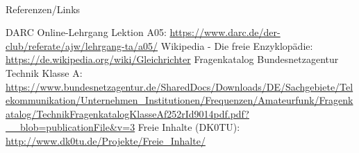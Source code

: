\hypertarget{refs}{}
\textcolor{white}{} \\ %
\Large Referenzen/Links
\footnotesize

\begin{thebibliography}{}
    DARC Online-Lehrgang Lektion A05:
    \url{https://www.darc.de/der-club/referate/ajw/lehrgang-ta/a05/}
      Wikipedia - Die freie Enzyklopädie:
    \url{https://de.wikipedia.org/wiki/Gleichrichter}
     Fragenkatalog Bundesnetzagentur Technik Klasse A:
    \url{https://www.bundesnetzagentur.de/SharedDocs/Downloads/DE/Sachgebiete/Telekommunikation/Unternehmen_Institutionen/Frequenzen/Amateurfunk/Fragenkatalog/TechnikFragenkatalogKlasseAf252rId9014pdf.pdf?__blob=publicationFile&v=3}
      Freie Inhalte (DK0TU):
    \url{http://www.dk0tu.de/Projekte/Freie_Inhalte/}
\end{thebibliography}


